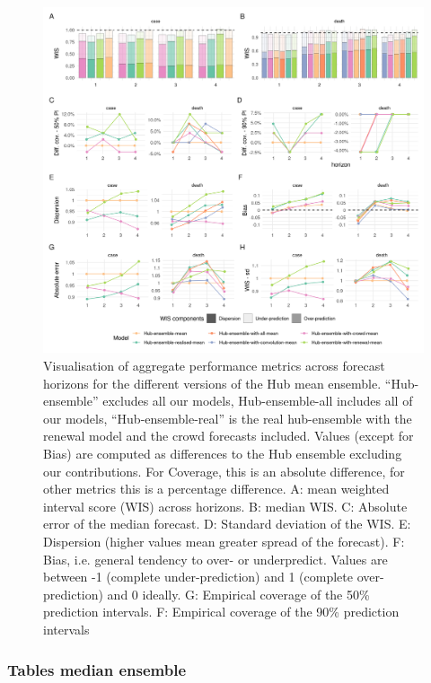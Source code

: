 \documentclass[
]{article}
\begin{document}
\begin{figure}[H]
\includegraphics[width=1\linewidth,]{../analysis/plots/aggregate-performance-rel-ensemble-mean-v4} \caption{Visualisation of aggregate performance metrics across forecast horizons for the different versions of the Hub mean ensemble. “Hub-ensemble” excludes all our models, Hub-ensemble-all includes all of our models, “Hub-ensemble-real” is the real hub-ensemble with the renewal model and the crowd forecasts included. Values (except for Bias) are computed as differences to the Hub ensemble excluding our contributions. For Coverage, this is an absolute difference, for other metrics this is a percentage difference. A: mean weighted interval score (WIS) across horizons. B: median WIS. C: Absolute error of the median forecast. D: Standard deviation of the WIS. E: Dispersion (higher values mean greater spread of the forecast). F: Bias, i.e. general tendency to over- or underpredict. Values are between -1 (complete under-prediction) and 1 (complete over-prediction) and 0 ideally. G: Empirical coverage of the 50\% prediction intervals. F: Empirical coverage of the 90\% prediction intervals}\label{fig:agg-performance-ensemble-mean}
\end{figure}

\hypertarget{tables-median-ensemble}{%
\subsubsection{Tables median ensemble}\label{tables-median-ensemble}}
\end{document}
